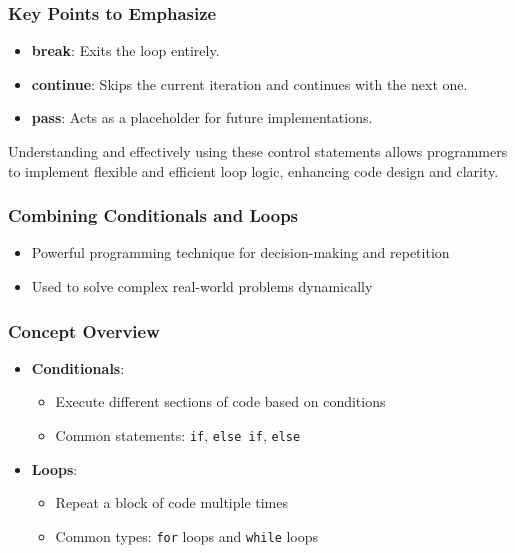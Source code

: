\documentclass{beamer}
\begin{document}
\begin{frame}[fragile]
    \frametitle{Key Points to Emphasize}
    \begin{itemize}
        \item \textbf{break}: Exits the loop entirely.
        \item \textbf{continue}: Skips the current iteration and continues with the next one.
        \item \textbf{pass}: Acts as a placeholder for future implementations.
    \end{itemize}
    
    Understanding and effectively using these control statements allows programmers to implement flexible and efficient loop logic, enhancing code design and clarity.
\end{frame}

\begin{frame}
    \frametitle{Combining Conditionals and Loops}
    \begin{itemize}
        \item Powerful programming technique for decision-making and repetition
        \item Used to solve complex real-world problems dynamically
    \end{itemize}
\end{frame}

\begin{frame}
    \frametitle{Concept Overview}
    \begin{itemize}
        \item \textbf{Conditionals}:
            \begin{itemize}
                \item Execute different sections of code based on conditions
                \item Common statements: \texttt{if}, \texttt{else if}, \texttt{else}
            \end{itemize}
        \item \textbf{Loops}:
            \begin{itemize}
                \item Repeat a block of code multiple times
                \item Common types: \texttt{for} loops and \texttt{while} loops
            \end{itemize}
    \end{itemize}
\end{frame}
\end{document}
